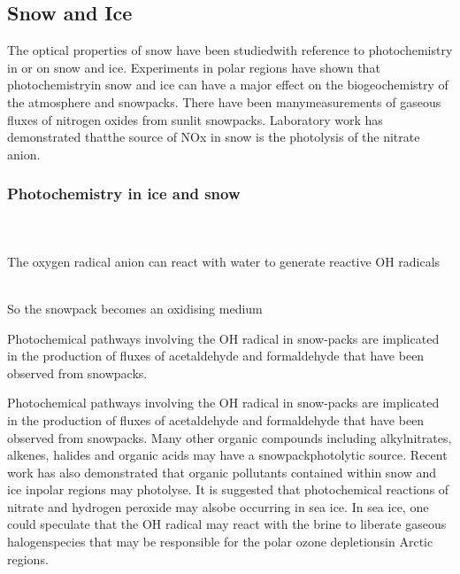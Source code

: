 \documentclass[a4paper,12pt,titlepage]{article}
\begin{document}
\subsection{Snow and Ice}
The optical properties of snow have been studiedwith reference to photochemistry in or on snow and ice. Experiments in polar regions have shown that photochemistryin snow and ice can have a major effect on the biogeochemistry of the atmosphere and snowpacks. There have been manymeasurements of gaseous fluxes of nitrogen oxides from sunlit snowpacks. Laboratory work has demonstrated thatthe source of NOx in snow is the photolysis of the nitrate anion.
\begin{frame}
\frametitle{Photochemistry in ice and snow}
\hfill\\
\medskip {}\hfill\\
\bigskip The oxygen radical anion can react with water to generate reactive OH radicals\newline

\medskip {}\hfill\\
\medskip So the snowpack becomes an oxidising medium

Photochemical pathways involving the OH radical in snow-packs are implicated in the production of fluxes of acetaldehyde and  formaldehyde  that  have  been  observed  from  snowpacks. 
\end{frame}

Photochemical pathways involving the OH radical in snow-packs are implicated in the production of fluxes of acetaldehyde and  formaldehyde  that  have  been  observed  from  snowpacks. Many other organic compounds including alkylnitrates, alkenes, halides and organic acids may have a snowpackphotolytic source. Recent work has also demonstrated that organic pollutants contained within snow and ice inpolar regions may photolyse. It is suggested that photochemical reactions of nitrate and hydrogen peroxide may alsobe occurring in sea ice. In sea ice, one could speculate that the OH radical may react with the brine to liberate gaseous halogenspecies that may be responsible for the polar ozone depletionsin Arctic regions.
\end{document}
